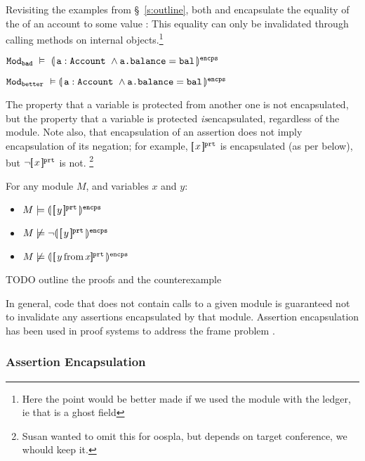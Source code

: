 Revisiting the examples from \S~\ref{s:outline}, %
both \ModB and \ModC encapsulate   the  {equality of the  of an account to some value : }
 {This equality can only be invalidated} through calling  methods on internal objects.\footnote{Here 
 the point would be better made if we used the module with the ledger, ie that  is a ghost field}
%
\\
\strut \hspace{1cm}
${\texttt{Mod}}_{{\texttt{bad}}}\ \vDash\ \llparenthesis\,  {\texttt{a}}:{\texttt{Account}}\ \wedge {\texttt{a.balance}}={\texttt{bal}}\, \rrparenthesis^{\texttt{encps}}$
\\
\strut \hspace{1cm}
${\texttt{Mod}}_{{\texttt{better}}}\ \vDash\llparenthesis\,  {\texttt{a}}:{\texttt{Account}}\ \wedge {\texttt{a.balance}}={\texttt{bal}}\, \rrparenthesis^{\texttt{encps}}$


The property that a variable is protected from another one is not encapsulated, but  the property that a variable is protected \emph{is}encapsulated, regardless of the module. Note also, that  encapsulation of an assertion does not imply encapsulation of its negation; 
 for example,  ${[\!\![ \,x\, ]\!\!]^{{\texttt{prt}}}}$ is encapsulated (as per below), but $\neg  {\ensuremath{[\!\![ \,x\, }]\!\!]^{{\texttt{prt}}}}$ is not. \footnote{Susan wanted to omit this for oospla, but depends on target conference, we whould keep it.}



\begin{lemma}
For any module $M$, and variables $x$ and $y$:
\begin{itemize}
\item $M \models \llparenthesis\, [\!\![ \,y\, ]\!\!]^{{\texttt{prt}}}\, \rrparenthesis^{\texttt{encps}}$
\item $M \not\models \neg{\ensuremath \llparenthesis\, \ensuremath{[\!\![ \,y\, }]\!\!]^{{\texttt{prt}}}\, \rrparenthesis^{\texttt{encps}}}$
\item $M \not\models {\ensuremath \llparenthesis\, \ensuremath{[\!\![ \,y\, \mbox{from}\, x]\!\!]^{{\texttt{prt}}}}\, \rrparenthesis^{\texttt{encps}}}$
\end{itemize}
\end{lemma}

TODO outline the proofs and the counterexample
\noindent 


{In general},  code that does not contain 
calls to a {given} module is guaranteed not to invalidate any assertions encapsulated by that module.
 Assertion encapsulation has been used in proof systems to {address}   the  {frame} problem
 \cite{objInvars,encaps}. 

\subsubsection{ Assertion Encapsulation}


